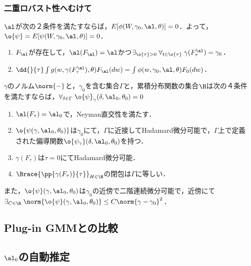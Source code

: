 \documentclass[uplatex,dvipdfmx]{jsreport}
\begin{document}
\subsubsection{二重ロバスト性へむけて}

\begin{theorem}[$\al$の十分条件]
    $\al$が次の２条件を満たすならば，$E[\phi(W,\gamma_0,\al,\theta)]=0$．よって，$\o{\psi}=E[\psi(W,\gamma_0,\al,\theta)]=0$．
    \begin{enumerate}
        \item $F_\al$が存在して，$\al(F_\al)=\al$かつ$\exists_{\o{\tau}>0}\;\forall_{t\in\o{\tau}}\;\gamma(F^\al_\tau)=\gamma_0$．
        \item $\dd{}{\tau}\int g(w,\gamma(F^\al_\tau),\theta)F_\al(dw)=\int\phi(w,\gamma_0,\al,\theta)F_0(dw)$．
    \end{enumerate}
\end{theorem}

\begin{theorem}\label{thm-3}
    $\gamma$のノルム$\norm{-}$と，$\gamma_0$を含む集合$\Gamma$と，累積分布関数の集合$\H$は次の４条件を満たすならば，$\forall_{\delta\in\Gamma}\;\o{\psi}_\gamma(\delta,\al_0,\theta_0)=0$
    \begin{enumerate}
        \item $\al(F_\tau)=\al_0$で，Neyman直交性を満たす．
        \item $\o{\psi(\gamma,\al_0,\theta_0)}$は$\gamma_0$にて，$\Gamma$に近接してHadamard微分可能で，$\Gamma$上で定義された偏導関数$\o{\psi_\gamma}(\delta,\al_0,\theta_0)$を持つ．
        \item $\gamma(F_\tau)$は$\tau=0$にてHadamard微分可能．
        \item $\Brace{\pp{\gamma(F_\tau)}{\tau}}_{H\in\H}$の閉包は$\Gamma$に等しい．
    \end{enumerate}
    また，$\o{\psi}(\gamma,\al_0,\theta_0)$は$\gamma_0$の近傍で二階連続微分可能で，近傍にて$\exists_{C\in\R}\;\norm{\o{\psi}(\gamma,\al_0,\theta_0)}\le C\norm{\gamma-\gamma_0}^2$．
\end{theorem}

\subsection{Plug-in GMMとの比較}

\subsection{$\al_0$の自動推定}
\end{document}
